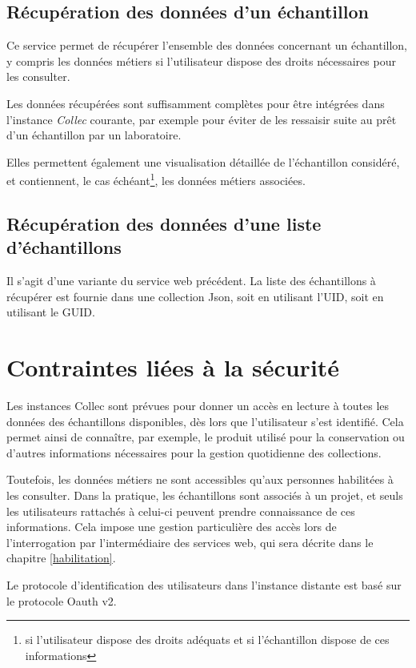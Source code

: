 \subsection{Récupération des données d'un échantillon}
Ce service permet de récupérer l'ensemble des données concernant un échantillon, y compris les données \og métiers \fg{} si l'utilisateur dispose des droits nécessaires pour les consulter.

Les données récupérées sont suffisamment complètes pour être intégrées dans l'instance \textit{Collec} courante, par exemple pour éviter de les ressaisir suite au prêt d'un échantillon par un laboratoire.

Elles permettent également une visualisation détaillée de l'échantillon considéré, et contiennent, le cas échéant\footnote{si l'utilisateur dispose des droits adéquats et si l'échantillon dispose de ces informations}, les données \og métiers \fg{} associées.

\subsection{Récupération des données d'une liste d'échantillons}

Il s'agit d'une variante du service web précédent. La liste des échantillons à récupérer est fournie dans une collection Json, soit en utilisant l'UID, soit en utilisant le GUID.

\section{Contraintes liées à la sécurité}

Les instances Collec sont prévues pour donner un accès en lecture à toutes les données des échantillons disponibles, dès lors que l'utilisateur s'est identifié. Cela permet ainsi de connaître, par exemple, le produit utilisé pour la conservation ou d'autres informations nécessaires pour la gestion quotidienne des collections.

Toutefois, les données \og métiers \fg ne sont accessibles qu'aux personnes habilitées à les consulter. Dans la pratique, les échantillons sont associés à un projet, et seuls les utilisateurs rattachés à celui-ci peuvent prendre connaissance de ces informations.
Cela impose une gestion particulière des accès lors de l'interrogation par l'intermédiaire des services web, qui sera décrite dans le chapitre \ref{habilitation}.

Le protocole d'identification des utilisateurs dans l'instance distante est basé sur le protocole Oauth v2.

